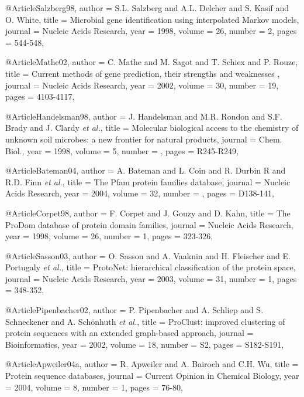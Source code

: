 @Article{Salzberg98,
  author = {S.L. Salzberg and A.L. Delcher and S. Kasif and O. White},
  title =  {{Microbial gene identification using interpolated Markov models}},
  journal = {Nucleic Acids Research},
  year = {1998},
  volume =  {26},
  number =  {2},
  pages =   {544-548},
}


@Article{Mathe02,
  author = {C. Mathe and  M. Sagot and T. Schiex and P. Rouze},
  title =  {Current methods of gene prediction, their strengths and weaknesses },
  journal = {Nucleic Acids Research},
  year = {2002},
  volume =  {30},
  number =  {19},
  pages =   {4103-4117},
}


@Article{Handelsman98,
  author = {J. Handelsman and  M.R. Rondon and S.F. Brady and J. Clardy {\it et al.}},
  title =  {Molecular biological access to the chemistry of unknown soil microbes: a new frontier for natural products},
  journal = {Chem. Biol.},
  year = {1998},
  volume =  {5},
  number =  {},
  pages =   {R245-R249},
}

@Article{Bateman04,
  author = {A. Bateman and L. Coin and R. Durbin R and R.D. Finn {\it et al.}},
  title =  {The {Pfam} protein families database},
  journal = {Nucleic Acids Research},
  year = {2004},
  volume =  {32},
  number =  {},
  pages =   {D138-141},
}

@Article{Corpet98,
  author = {F. Corpet and J. Gouzy and D. Kahn},
  title =  {{The ProDom} database of protein domain families},
  journal = {Nucleic Acids Research},
  year = {1998},
  volume =  {26},
  number =  {1},
  pages =   {323-326},
}

@Article{Sasson03,
  author = {O. Sasson and A. Vaaknin and H. Fleischer and E. Portugaly {\it et al.}},
  title =  {{ProtoNet}: hierarchical classification of the protein space},
  journal = {Nucleic Acids Research},
  year = {2003},
  volume =  {31},
  number =  {1},
  pages =   {348-352},
}

@Article{Pipenbacher02,
  author = {P. Pipenbacher and A. Schliep and S. Schneckener and A. Schönhuth {\it et al.}},
  title =  {{ProClust}: improved clustering of protein sequences with an extended graph-based approach},
  journal = {Bioinformatics},
  year = {2002},
  volume =  {18},
  number =  {S2},
  pages =   {S182-S191},
}

@Article{Apweiler04a,
  author = {R. Apweiler and A. Bairoch and C.H. Wu},
  title =  {{Protein} sequence databases},
  journal = {Current Opinion in Chemical Biology},
  year = {2004},
  volume =  {8},
  number =  {1},
  pages =   {76-80},
}

